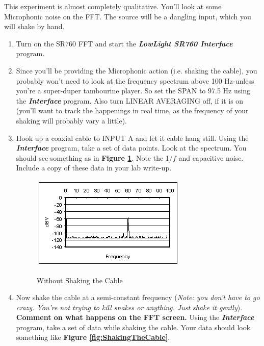 \documentclass{../lab}
\begin{document}
This experiment is almost completely qualitative. You'll look at some Microphonic noise on the FFT. The source will be a dangling input, which you will shake by hand.

\begin{enumerate}
    \item Turn on the SR760 FFT and start the \emph{\textbf{LowLight SR760 Interface}} program.

    \item Since you'll be providing the Microphonic action (i.e. shaking the cable), you probably won't need to look at the frequency spectrum above 100 Hz-unless you're a super-duper tambourine player. So set the SPAN to 97.5 Hz using the \emph{\textbf{Interface}} program. Also turn LINEAR AVERAGING off, if it is on (you'll want to track the happenings in real time, as the frequency of your shaking will probably vary a little).

    \item Hook up a coaxial cable to INPUT A and let it cable hang still. Using the \emph{\textbf{Interface}} program, take a set of data points. Look at the spectrum. You should see something as in \textbf{Figure \ref{fig:WithoutShakingTheCable}}. Note the 1/$f$ and capacitive noise. Include a copy of these data in your lab write-up.

    \begin{figure}[h]
        \centering
        \href{http://experimentationlab.berkeley.edu/sites/default/files/images/LLSimage025.gif}{\includegraphics[width=0.5\linewidth]{images/LLSimage025.png}}
        \caption{Without Shaking the Cable}
        \label{fig:WithoutShakingTheCable}
    \end{figure}

    \item Now shake the cable at a semi-constant frequency (\emph{Note: you don't have to go crazy. You're not trying to kill snakes or anything. Just shake it gently}). \textbf{Comment on what happens on the FFT screen.} Using the \emph{\textbf{Interface}} program, take a set of data while shaking the cable. Your data should look something like \textbf{Figure \ref{fig:ShakingTheCable}}.


\end{enumerate}
\end{document}
